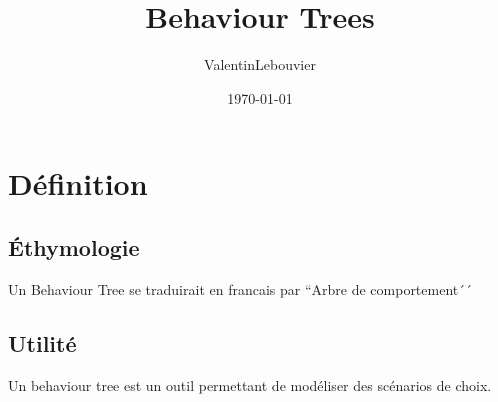 \documentclass[11pt]{article}
\author{ValentinLebouvier}
\date{\today}
\title{Behaviour Trees}
\begin{document}
\maketitle
\tableofcontents


\section{Définition}
\label{sec-1}
\subsection{Éthymologie}
\label{sec-1-1}
Un Behaviour Tree se traduirait en francais par ``Arbre de comportement´´
\subsection{Utilité}
\label{sec-1-2}
Un behaviour tree est un outil permettant de modéliser des scénarios de choix.
\end{document}
